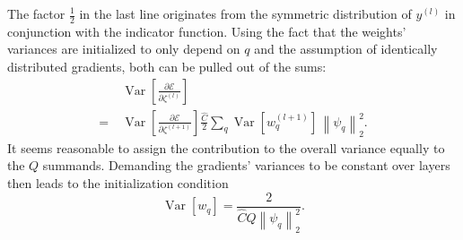 \documentclass[10pt,twocolumn,letterpaper]{article}
\newcommand{\Var}{\operatorname{Var}}
\newcommand{\norm}[1]{\left\lVert #1 \right\rVert}
\begin{document}
The factor $\frac{1}{2}$ in the last line originates from the symmetric distribution of $y^{(l)}$ in conjunction with the indicator function.
Using the fact that the weights' variances are initialized to only depend on $q$ and the assumption of identically distributed gradients, both can be pulled out of the sums:
\begin{equation*}
\begin{split}
 &\ \Var\left[\frac{\partial\mathcal{E}}{\partial\zeta^{(l)}}\right]\\
=&\ \Var\left[\frac{\partial\mathcal{E}}{\partial\zeta^{(l+1)}}\right]\frac{\hat{C}}{2}\sum_q\Var\left[w_q^{(l+1)}\right]\,\norm{\psi_q}_2^2.
\end{split}
\end{equation*}
It seems reasonable to assign the contribution to the overall variance equally to the $Q$ summands.
Demanding the gradients' variances to be constant over layers then leads to the initialization condition
\begin{equation*}
\Var\left[w_q\right]=\frac{2}{\hat{C}Q\norm{\psi_q}_2^2}.
\end{equation*}
\end{document}
